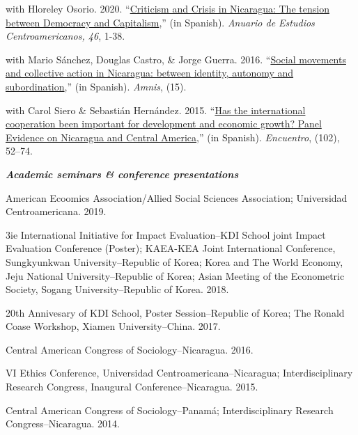 \documentclass[11pt,article,oneside, a4paper]{memoir}
\begin{document}
\ind with Hloreley Osorio. 2020. ``\href{https://revistas.ucr.ac.cr/index.php/anuario/article/view/45081/44860}{Criticism and Crisis in Nicaragua: The tension between Democracy and Capitalism},'' (in Spanish). \emph{Anuario de Estudios Centroamericanos, 46}, 1-38.

\ind with Mario Sánchez, Douglas Castro, \& Jorge Guerra. 2016. ``\href{https://amnis.revues.org/2813}{Social movements and collective action in Nicaragua: between identity, autonomy and subordination},'' (in Spanish). \emph{Amnis}, (15).

\ind with Carol Siero \& Sebastián Hernández. 2015. ``\href{http://www.uca.edu.ni/2/images/Revista-Encuentro/Revistas/e102/art-5.pdf}{Has the international cooperation been important for development and economic growth? Panel Evidence on Nicaragua and Central America},'' (in Spanish). \emph{Encuentro}, (102), 52--74.


\medskip
\noindent\emph{\textbf{Academic seminars \& conference presentations} \vspace{0.05in}}

\ind American Ecoomics Association/Allied Social Sciences Association; Universidad Centroamericana. 2019.

\ind 3ie International Initiative for Impact Evaluation--KDI School joint Impact Evaluation Conference (Poster); KAEA-KEA Joint International Conference, Sungkyunkwan University–Republic of Korea; Korea and The World Economy, Jeju National
University–Republic of Korea; Asian Meeting of the Econometric Society, Sogang University–Republic
of Korea. 2018. 

\ind 20th Annivesary of KDI School, Poster Session–Republic of Korea; The Ronald Coase Workshop, Xiamen University–China. 2017. 

\ind Central American Congress of Sociology–Nicaragua. 2016. 

\ind VI Ethics Conference, Universidad Centroamericana–Nicaragua; Interdisciplinary Research Congress,
Inaugural Conference–Nicaragua. 2015. 

\ind Central American Congress of Sociology–Panamá; Interdisciplinary Research Congress–Nicaragua. 2014. 

\bigskip

\end{document}

